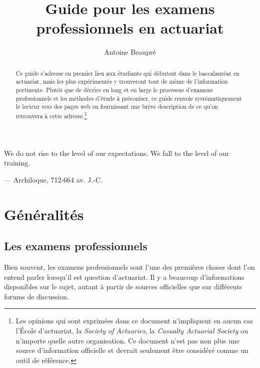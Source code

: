 \documentclass[11pt,french]{article}
\title{Guide pour les examens professionnels en actuariat}
\author{Antoine Beaupré}
\begin{document}
\maketitle
\thispagestyle{fancy}
\begin{abstract}
Ce guide s'adresse en premier lieu aux étudiants qui débutent dans le baccalauréat en actuariat, mais les plus expérimentés y trouveront tout de même de l'information pertinente. Plutôt que de décrire en long et en large le processus d'examens professionnels et les méthodes d'étude à préconiser, ce guide renvoie systématiquement le lecteur vers des pages web en fournissant une brève description de ce qu'on retrouvera à cette adresse.\footnote{Les opinions qui sont exprimées dans ce document n'impliquent en aucun cas l'École d'actuariat, la \emph{Society of Actuaries}, la \emph{Casualty Actuarial Society} ou n'importe quelle autre organisation. Ce document n'est pas non plus une source d'information officielle et devrait seulement être considéré comme un outil de référence.}{\tiny} 
\end{abstract}

\clearpage
{}
\begin{center}
\begin{minipage}{.6\textwidth}
\epigraph{We do not rise to the level of our expectations. We fall to the level of our training.}{--- \textup{Archiloque}, 712-664 av. J.-C.}
\end{minipage}
\end{center}
\clearpage

\newpage
\tableofcontents

\newpage
{}
\setcounter{page}{1}
\section*{Généralités}
\label{sec:generalites}

\subsection*{Les examens professionnels}
\label{subsec:examsprofs}
\captionsetup{justification=centering}
Bien souvent, les examens professionnels sont l'une des premières choses dont l'on entend parler lorsqu'il est question d'actuariat. Il y a beaucoup d'informations disponibles sur le sujet, autant à partir de sources officielles que sur différents forums de discussion.\vspace{\baselineskip}
\end{document}
